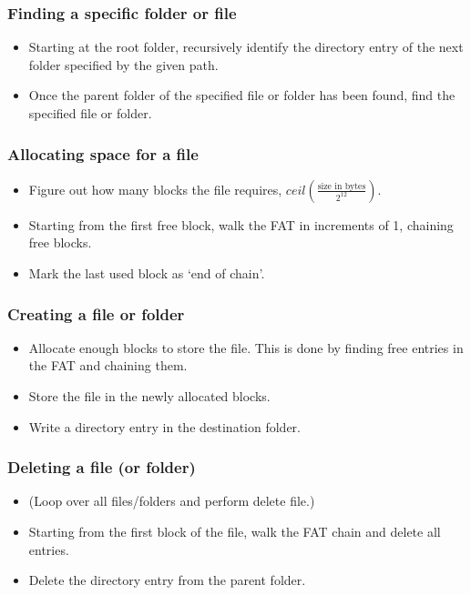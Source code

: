 \documentclass[11pt]{article}
\begin{document}
\subsubsection{Finding a specific folder or file}\label{finding-a-specific-folder-or-file}
    \begin{itemize}
        \itemsep1pt\parskip0pt
        \item{Starting at the root folder, recursively identify the directory entry}
          of the next folder specified by the given path.
        \item{Once the parent folder of the specified file or folder has been found,}
          find the specified file or folder.
    \end{itemize}

\subsubsection{Allocating space for a file}\label{allocating-space-for-a-file}
    \begin{itemize}
        \itemsep1pt\parskip0pt
        \item{Figure out how many blocks the file requires,}
          $ceil(\frac{\text{size in bytes}}{2^{12}})$.
        \item{Starting from the first free block, walk the FAT in increments of 1, chaining free blocks.}
        \item{Mark the last used block as `end of chain'.}
    \end{itemize}

\subsubsection{Creating a file or folder}\label{creating-a-file-or-folder}
    \begin{itemize}
        \itemsep1pt\parskip0pt
        \item{Allocate enough blocks to store the file. This is done by finding free entries in the FAT and chaining them.}
        \item{Store the file in the newly allocated blocks.}
        \item{Write a directory entry in the destination folder.}
    \end{itemize}

\subsubsection{Deleting a file (or folder)}\label{deleting-a-file-or-folder}
    \begin{itemize}
        \itemsep1pt\parskip0pt
        \item{(Loop over all files/folders and perform delete file.)}
        \item{Starting from the first block of the file, walk the FAT chain and delete all entries.}
        \item{Delete the directory entry from the parent folder.}
    \end{itemize}
\end{document}
